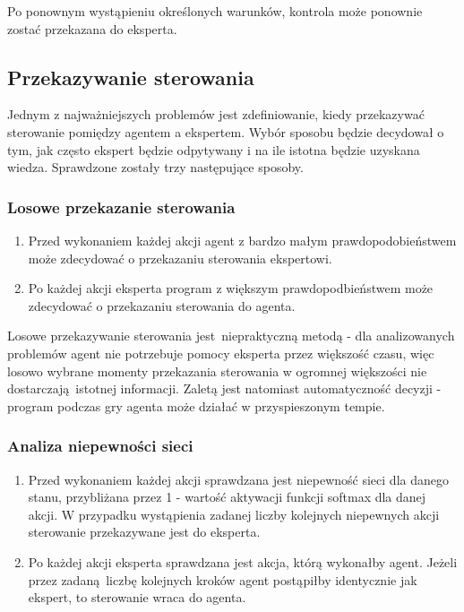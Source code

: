 Po ponownym wystąpieniu określonych warunków, kontrola może ponownie zostać przekazana do eksperta.

\subsection{Przekazywanie sterowania}
Jednym z najważniejszych problemów jest zdefiniowanie, kiedy przekazywać sterowanie pomiędzy agentem a ekspertem. Wybór sposobu będzie decydował o tym, jak często ekspert będzie odpytywany i na ile istotna będzie uzyskana wiedza. Sprawdzone zostały trzy następujące sposoby.

\subsubsection{Losowe przekazanie sterowania}
\begin{enumerate}
\item Przed wykonaniem każdej akcji agent z bardzo małym prawdopodobieństwem może zdecydować o przekazaniu sterowania ekspertowi.
\item Po każdej akcji eksperta program z większym prawdopodbieństwem może zdecydować o przekazaniu sterowania do agenta.
\end{enumerate}

Losowe przekazywanie sterowania jest niepraktyczną metodą - dla analizowanych problemów agent nie potrzebuje pomocy eksperta przez większość czasu, więc losowo wybrane momenty przekazania sterowania w ogromnej większości nie dostarczają istotnej informacji. Zaletą jest natomiast automatyczność decyzji - program podczas gry agenta może działać w przyspieszonym tempie.

\subsubsection{Analiza niepewności sieci}
\begin{enumerate}
\item Przed wykonaniem każdej akcji sprawdzana jest niepewność sieci dla danego stanu, przybliżana przez 1 - wartość aktywacji funkcji softmax dla danej akcji. W przypadku wystąpienia zadanej liczby kolejnych niepewnych akcji sterowanie przekazywane jest do eksperta.
\item Po każdej akcji eksperta sprawdzana jest akcja, którą wykonałby agent. Jeżeli przez zadaną liczbę kolejnych kroków agent postąpiłby identycznie jak ekspert, to sterowanie wraca do agenta.
\end{enumerate}

